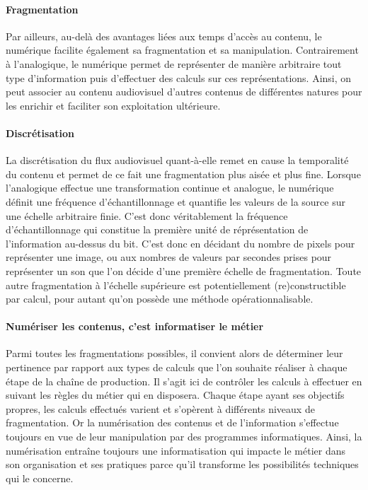 \paragraph{Fragmentation}
Par ailleurs, au-delà des avantages liées aux temps d'accès au contenu, le numérique facilite également sa fragmentation et sa manipulation.
Contrairement à l'analogique, le numérique permet de représenter de manière arbitraire tout type d'information puis d'effectuer des calculs sur ces représentations. 
Ainsi, on peut associer au contenu audiovisuel d'autres contenus de différentes natures pour les enrichir et faciliter son exploitation ultérieure.

\paragraph{Discrétisation}
La discrétisation du flux audiovisuel quant-à-elle remet en cause la temporalité du contenu et permet de ce fait une fragmentation plus aisée et plus fine. 
Lorsque l'analogique effectue une transformation continue et analogue, le numérique définit une fréquence d'échantillonnage et quantifie les valeurs de la source sur une échelle arbitraire finie. 
C'est donc véritablement la fréquence d'échantillonnage qui constitue la première unité de réprésentation de l'information au-dessus du bit.
C'est donc en décidant du nombre de pixels pour représenter une image, ou aux nombres de valeurs par secondes prises pour représenter un son que l'on décide d'une première échelle de fragmentation. 
Toute autre fragmentation à l'échelle supérieure est potentiellement (re)constructible par calcul, pour autant qu'on possède une méthode opérationnalisable. 

\paragraph{Numériser les contenus, c'est informatiser le métier}
Parmi toutes les fragmentations possibles, il convient alors de déterminer leur pertinence par rapport aux types de calculs que l'on souhaite réaliser à chaque étape de la chaîne de production. 
Il s'agit ici de contrôler les calculs à effectuer en suivant les règles du métier qui en disposera.
Chaque étape ayant ses objectifs propres, les calculs effectués varient et s'opèrent à différents niveaux de fragmentation. 
Or la numérisation des contenus et de l'information s'effectue toujours en vue de leur manipulation par des programmes informatiques.
Ainsi, la numérisation entraîne toujours une informatisation qui impacte le métier dans son organisation et ses pratiques parce qu'il transforme les possibilités techniques qui le concerne.



